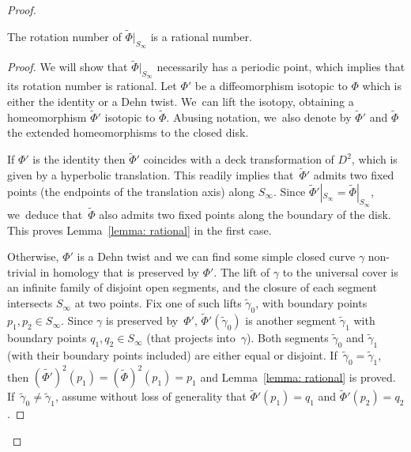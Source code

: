 \begin{proof}
\begin{lemma}\label{lemma: rational}
The rotation number of $\widetilde{\Phi}|_{S_\infty}$ is a rational number.
\end{lemma}

\begin{proof}
We will show that $\widetilde{\Phi}|_{S_\infty}$ necessarily has a periodic point, which implies that its rotation number is rational. Let $\Phi'$ be a diffeomorphism isotopic to $\Phi$ which is either the identity or a Dehn twist. We~can lift the isotopy, obtaining a homeomorphism $\widetilde \Phi'$ isotopic to $\widetilde \Phi$. Abusing notation, we~also denote by $\widetilde \Phi'$ and $\widetilde \Phi$ the extended homeomorphisms to the closed disk.

If $\Phi'$ is the identity then $\widetilde \Phi'$ coincides with a deck transformation of $D^2$, which is given by a hyperbolic translation. This readily implies that~$\widetilde \Phi'$ admits two fixed points (the endpoints of the translation axis) along $S_\infty$. Since $\widetilde \Phi'|_{S_\infty}=\widetilde \Phi|_{S_\infty}$, we~deduce that~$\widetilde \Phi$ also admits two fixed points along the boundary of the disk. This proves Lemma~\ref{lemma: rational} in the first case.

Otherwise, $\Phi'$ is a Dehn twist and we can find some simple closed curve $\gamma$ non-trivial in homology that is preserved by $\Phi'$. The lift of $\gamma$ to the universal cover is an infinite family of disjoint open segments, and the closure of each segment intersects $S_\infty$ at two points. Fix one of such lifts $\widetilde \gamma_0$, with boundary points $p_1,p_2 \in S_\infty$. Since $\gamma$ is preserved by~$\Phi'$, $\widetilde \Phi'(\widetilde \gamma_0)$ is another segment $\widetilde \gamma_1$ with boundary points $q_1, q_2 \in S_\infty$ (that projects into~$\gamma$). Both segments $\widetilde \gamma_0$ and $\widetilde \gamma_1$ (with their boundary points included) are either equal or disjoint. If~$\widetilde{\gamma}_0=\widetilde{\gamma}_1$, then $(\widetilde{\Phi'})^2(p_1)=(\widetilde{\Phi})^2(p_1)=p_1$ and Lemma~\ref{lemma: rational} is proved. If~$\widetilde{\gamma}_0\neq \widetilde{\gamma}_1$, assume without loss of generality that $\widetilde \Phi'(p_1)=q_1$ and $\widetilde \Phi'(p_2)=q_2$.


\end{proof}
\end{proof}
